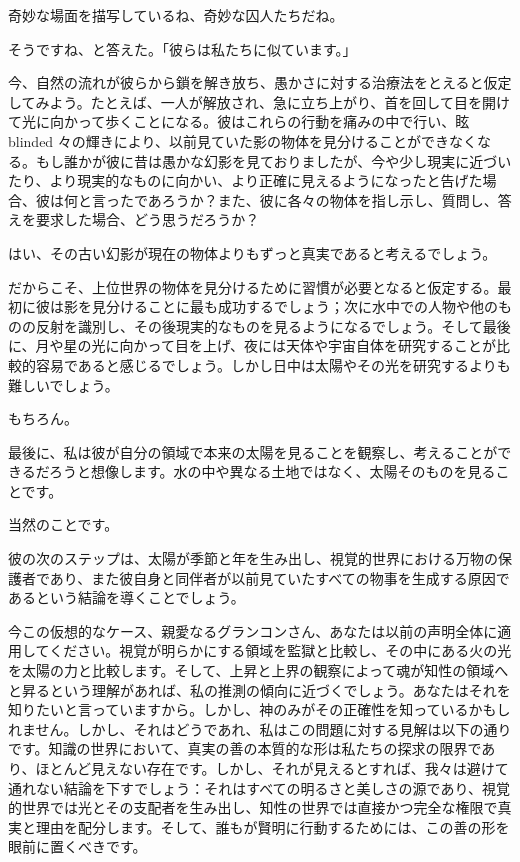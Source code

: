 \documentclass[a4paper,11pt,openany]{ltjsbook}
\begin{document}
奇妙な場面を描写しているね、奇妙な囚人たちだね。

そうですね、と答えた。「彼らは私たちに似ています。」

今、自然の流れが彼らから鎖を解き放ち、愚かさに対する治療法をとえると仮定してみよう。たとえば、一人が解放され、急に立ち上がり、首を回して目を開けて光に向かって歩くことになる。彼はこれらの行動を痛みの中で行い、眩 blinded 々の輝きにより、以前見ていた影の物体を見分けることができなくなる。もし誰かが彼に昔は愚かな幻影を見ておりましたが、今や少し現実に近づいたり、より現実的なものに向かい、より正確に見えるようになったと告げた場合、彼は何と言ったであろうか？また、彼に各々の物体を指し示し、質問し、答えを要求した場合、どう思うだろうか？

はい、その古い幻影が現在の物体よりもずっと真実であると考えるでしょう。

だからこそ、上位世界の物体を見分けるために習慣が必要となると仮定する。最初に彼は影を見分けることに最も成功するでしょう；次に水中での人物や他のものの反射を識別し、その後現実的なものを見るようになるでしょう。そして最後に、月や星の光に向かって目を上げ、夜には天体や宇宙自体を研究することが比較的容易であると感じるでしょう。しかし日中は太陽やその光を研究するよりも難しいでしょう。

もちろん。

最後に、私は彼が自分の領域で本来の太陽を見ることを観察し、考えることができるだろうと想像します。水の中や異なる土地ではなく、太陽そのものを見ることです。

当然のことです。

彼の次のステップは、太陽が季節と年を生み出し、視覚的世界における万物の保護者であり、また彼自身と同伴者が以前見ていたすべての物事を生成する原因であるという結論を導くことでしょう。

今この仮想的なケース、親愛なるグランコンさん、あなたは以前の声明全体に適用してください。視覚が明らかにする領域を監獄と比較し、その中にある火の光を太陽の力と比較します。そして、上昇と上界の観察によって魂が知性の領域へと昇るという理解があれば、私の推測の傾向に近づくでしょう。あなたはそれを知りたいと言っていますから。しかし、神のみがその正確性を知っているかもしれません。しかし、それはどうであれ、私はこの問題に対する見解は以下の通りです。知識の世界において、真実の善の本質的な形は私たちの探求の限界であり、ほとんど見えない存在です。しかし、それが見えるとすれば、我々は避けて通れない結論を下すでしょう：それはすべての明るさと美しさの源であり、視覚的世界では光とその支配者を生み出し、知性の世界では直接かつ完全な権限で真実と理由を配分します。そして、誰もが賢明に行動するためには、この善の形を眼前に置くべきです。
\end{document}
